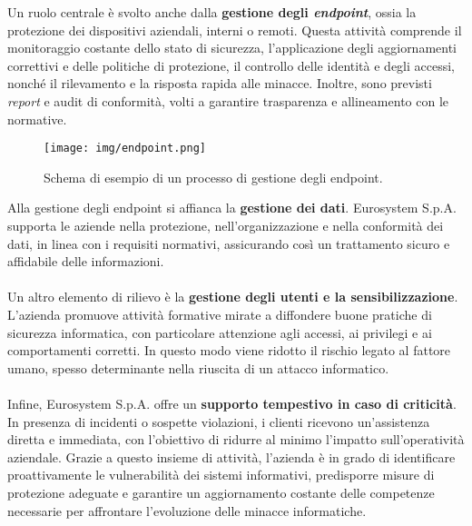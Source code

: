 Un ruolo centrale è svolto anche dalla \textbf{gestione degli \textit{endpoint}}, ossia la protezione dei dispositivi aziendali, interni o remoti. Questa attività comprende il monitoraggio costante dello stato di sicurezza, l'applicazione degli aggiornamenti correttivi e delle politiche di protezione, il controllo delle identità e degli accessi, nonché il rilevamento e la risposta rapida alle minacce. Inoltre, sono previsti \textit{report} e \gls{audit} di conformità, volti a garantire trasparenza e allineamento con le normative.  
\begin{figure}[H]
    \centering
    \texttt{[image: img/endpoint.png]}
    \caption{Schema di esempio di un processo di gestione degli endpoint.}
    \label{fig:endpoint_governance}    
\end{figure}  
Alla gestione degli endpoint si affianca la \textbf{gestione dei dati}. Eurosystem S.p.A. supporta le aziende nella protezione, nell'organizzazione e nella conformità dei dati, in linea con i requisiti normativi, assicurando così un trattamento sicuro e affidabile delle informazioni.\\\\  
Un altro elemento di rilievo è la \textbf{gestione degli utenti e la sensibilizzazione}. L'azienda promuove attività formative mirate a diffondere buone pratiche di sicurezza informatica, con particolare attenzione agli accessi, ai privilegi e ai comportamenti corretti. In questo modo viene ridotto il rischio legato al fattore umano, spesso determinante nella riuscita di un attacco informatico.\\\\  
Infine, Eurosystem S.p.A. offre un \textbf{supporto tempestivo in caso di criticità}. In presenza di incidenti o sospette violazioni, i clienti ricevono un'assistenza diretta e immediata, con l'obiettivo di ridurre al minimo l'impatto sull'operatività aziendale.  
Grazie a questo insieme di attività, l'azienda è in grado di identificare proattivamente le vulnerabilità dei sistemi informativi, predisporre misure di protezione adeguate e garantire un aggiornamento costante delle competenze necessarie per affrontare l'evoluzione delle minacce informatiche.  
